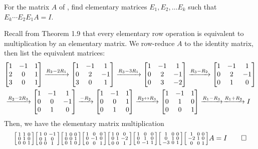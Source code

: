 \documentclass{agony}
\begin{document}
\begin{xca}
  For the matrix $A$ of , find elementary matrices $E_1, E_2, \dotsc E_k$
  such that $E_k \dotsm E_2 E_1 A = I$.
\end{xca}
\begin{sol}
  Recall from Theorem 1.9 that every elementary row operation is equivalent to multiplication
  by an elementary matrix.
  We row-reduce $A$ to the identity matrix, then list the equivalent matrices:
  \begin{equation*}
    \begin{split}
      & \mqty[1&-1&1 \\ 2&0&1 \\ 3&0&1]
      \xto{R_2 - 2R_1} \mqty[1&-1&1 \\ 0&2&-1 \\ 3&0&1]
      \xto{R_3 - 3R_1} \mqty[1&-1&1 \\ 0&2&-1 \\ 0&3&-2]
      \xto{R_3 - R_2} \mqty[1&-1&1 \\ 0&2&-1 \\ 0&1&0] \\
      & \xto{R_2 - 2R_3} \mqty[1&-1&1 \\ 0&0&-1 \\ 0&1&0]
      \xto{-R_2} \mqty[1&-1&1 \\ 0&0&1 \\ 0&1&0]
      \xto{R_2 \harr R_3} \mqty[1&-1&1 \\ 0&1&0 \\ 0&0&1]
      \xto{R_1 - R_3} \xto{R_1 + R_2} I
    \end{split}
  \end{equation*}
  Then, we have the elementary matrix multiplication
  \begin{equation*}
    \smqty[1&1&0\\0&1&0\\0&0&1]\smqty[1&0&-1\\0&1&0\\0&0&1]\smqty[1&0&0\\0&0&1\\0&1&0]
    \smqty[1&0&0\\0&-1&0\\0&0&1]\smqty[1&0&0\\0&1&-2\\0&0&1]\smqty[1&0&0\\0&1&0\\0&-1&1]
    \smqty[1&0&0\\0&1&0\\-3&0&1]\smqty[1&0&0\\-2&1&0\\0&0&1]A = I \qedhere
  \end{equation*}
\end{sol}
\end{document}

